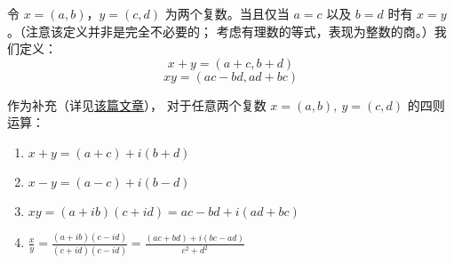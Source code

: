 \documentclass[../poma-notes.tex]{subfiles}
\begin{document}
令 $x=(a,b)$，$y=(c,d)$ 为两个复数。当且仅当 $a=c$ 以及 $b=d$ 时有 $x=y$。（注意该定义并非是完全不必要的；
考虑有理数的等式，表现为整数的商。）我们定义：
\[x+y=(a+c,b+d)\]
\[xy=(ac-bd,ad+bc)\]

\begin{anote}
  作为补充（详见\href{https://zhuanlan.zhihu.com/p/68763358}{该篇文章}），
  对于任意两个复数 $x=(a,b),\ y=(c,d)$ 的四则运算：
  \begin{enumerate}[label=(\arabic*)]
    \item $x+y=(a+c)+i(b+d)$
    \item $x-y=(a-c)+i(b-d)$
    \item $xy=(a+ib)(c+id)=ac-bd+i(ad+bc)$
    \item $\frac{x}{y} = \frac{(a+ib)(c-id)}{(c+id)(c-id)} = \frac{(ac+bd)+i(bc-ad)}{c^2+d^2}$
  \end{enumerate}


\end{anote}
\end{document}
